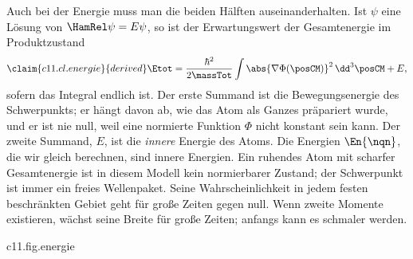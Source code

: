 Auch bei der Energie muss man die beiden Hälften auseinanderhalten. Ist $\psi$ eine
Lösung von $\HamRel\psi = E\psi$, so ist der Erwartungswert der Gesamtenergie im
Produktzustand
\begin{equation}\label{c11.eq.energie}\claim{c11.cl.energie}{derived}
  \Etot = \frac{\hbar^2}{2\massTot} \int \abs{\nabla\Phi(\posCM)}^2 \,\dd^3\posCM + E ,
\end{equation}
sofern das Integral endlich ist. Der erste Summand ist die Bewegungsenergie des
Schwerpunkts; er hängt davon ab, wie das Atom als Ganzes präpariert wurde, und er ist
nie null, weil eine normierte Funktion $\Phi$ nicht konstant sein kann. Der zweite
Summand, $E$, ist die \emph{innere} Energie des Atoms. Die Energien $\En{\nqn}$, die wir
gleich berechnen, sind innere Energien. Ein ruhendes Atom mit scharfer Gesamtenergie ist
in diesem Modell kein normierbarer Zustand; der Schwerpunkt ist immer ein freies
Wellenpaket. Seine Wahrscheinlichkeit in jedem festen beschränkten Gebiet geht für
große Zeiten gegen null. Wenn zweite Momente existieren, wächst seine Breite für große
Zeiten; anfangs kann es schmaler werden.

\begin{tpcfigure}{c11.fig.energie}
  \caption{Innere Energie und Gesamtenergie nach \eqref{c11.eq.energie}, für $\Znuc = 1$ und in Einheiten der Rydberg-Energie $\RydRed$ aus Abschnitt~\ref{c11.s4}. Die dicken Striche sind die inneren Energien $\En{1}$, $\En{2}$, $\En{3}$ aus Theorem~\ref{c11.thm.spektrum}. Schraffiert ist jeweils der Bereich, in dem der Erwartungswert der Gesamtenergie liegen kann: Er beginnt bei der inneren Energie und hat kein oberes Ende, weil die Bewegungsenergie des Schwerpunkts jeden positiven Wert haben kann.}
\end{tpcfigure}

